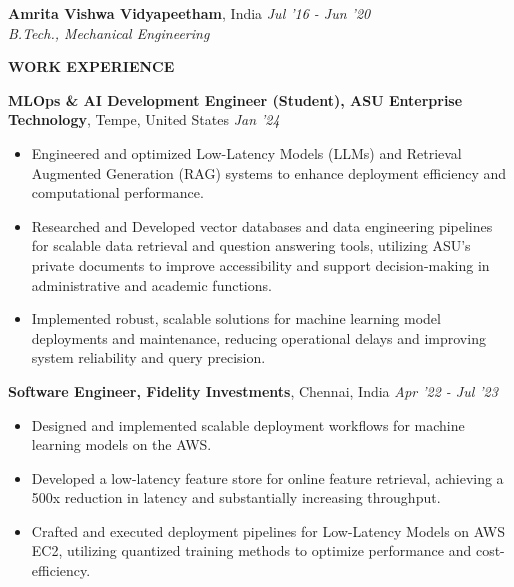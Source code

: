 \documentclass[10pt,a4]{article}
\def\hrulefill{\leavevmode\leaders\hrule height 1pt\hfill\kern 0pt}		%
\begin{document}
{\begin{flushleft}

    
    \textbf{\large Amrita Vishwa Vidyapeetham}, \large India \tab  \hfill \textit{\large Jul '16 - Jun '20}	\\
        \hspace{0.5 cm}\textit{\large B.Tech., Mechanical Engineering}

\end{flushleft}
		
		
		
\begin{flushleft}
    {\Large \textbf{WORK EXPERIENCE}} %

    \vspace{1.5mm}
    \textbf{\large MLOps \& AI Development Engineer (Student), ASU Enterprise Technology},   Tempe, United States \hfill \textit{\large Jan '24}	\\
    \begin{itemize}
        \item \large Engineered and optimized Low-Latency Models (LLMs) and Retrieval Augmented Generation (RAG) systems to enhance deployment efficiency and computational performance.
        \item \large Researched and Developed vector databases and data engineering pipelines for scalable data retrieval and question answering tools, utilizing ASU’s private documents to improve accessibility and support decision-making in administrative and academic functions.
        \item \large Implemented robust, scalable solutions for machine learning model deployments and maintenance, reducing operational delays and improving system reliability and query precision.
    \end{itemize}	
    \vspace{0.5mm}
    \textbf{\large Software Engineer, Fidelity Investments},  Chennai, India \hfill \textit{\large Apr '22 - Jul '23}	\\
    \begin{itemize}
        \item \large Designed and implemented scalable deployment workflows for machine learning models on the AWS.  
         \item \large Developed a low-latency feature store for online feature retrieval, achieving a 500x reduction in latency and substantially increasing throughput.
         \item \large Crafted and executed deployment pipelines for Low-Latency Models on AWS EC2, utilizing quantized training methods to optimize performance and cost-efficiency. 
    \end{itemize}	


\end{flushleft}}
\end{document}
